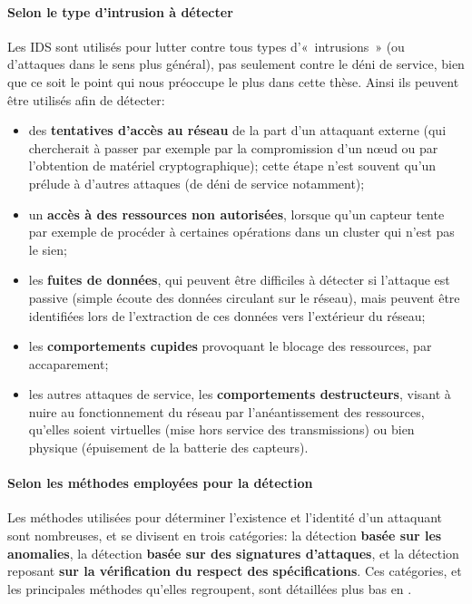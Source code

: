         \paragraph{Selon le type d'intrusion à détecter}
Les IDS sont utilisés pour lutter contre tous types d'« intrusions » (ou d'attaques dans le sens plus général), pas seulement contre le déni de service, bien que ce soit le point qui nous préoccupe le plus dans cette thèse.
Ainsi ils peuvent être utilisés afin de détecter:
\begin{itemize}
    \item des \textbf{tentatives d'accès au réseau} de la part d'un attaquant externe (qui chercherait à passer par exemple par la compromission d'un nœud ou par l'obtention de matériel cryptographique); cette étape n'est souvent qu'un prélude à d'autres attaques (de déni de service notamment);
    \item un \textbf{accès à des ressources non autorisées}, lorsque qu'un capteur tente par exemple de procéder à certaines opérations dans un cluster qui n'est pas le sien;
    \item les \textbf{fuites de données}, qui peuvent être difficiles à détecter si l'attaque est passive (simple écoute des données circulant sur le réseau), mais peuvent être identifiées lors de l'extraction de ces données vers l'extérieur du réseau;
    \item les \textbf{comportements cupides} provoquant le blocage des ressources, par accaparement;
    \item les autres attaques de service, \cad les \textbf{comportements destructeurs}, visant à nuire au fonctionnement du réseau par l'anéantissement des ressources, qu'elles soient virtuelles (mise hors service des transmissions) ou bien physique (épuisement de la batterie des capteurs).
\end{itemize}

        \paragraph{Selon les méthodes employées pour la détection}
Les méthodes utilisées pour déterminer l'existence et l'identité d'un attaquant sont nombreuses, et se divisent en trois catégories: la détection \textbf{basée sur les anomalies}, la détection \textbf{basée sur des signatures d'attaques}, et la détection reposant \textbf{sur la vérification du respect des spécifications}.
Ces catégories, et les principales méthodes qu'elles regroupent, sont détaillées plus bas en .

